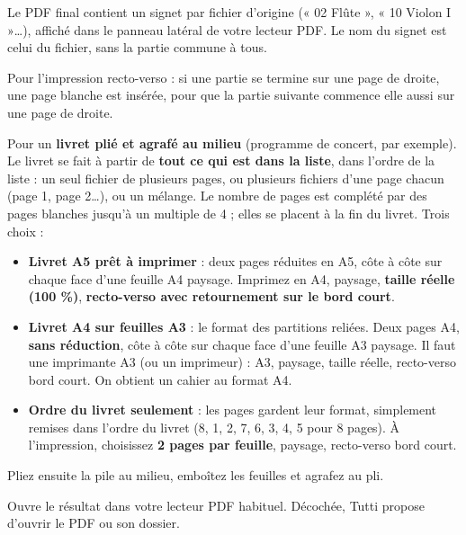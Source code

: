 \begin{description}[style=nextline,leftmargin=5mm,font=\sffamily\bfseries\color{bordeaux}]
\item[Un signet par fichier]
Le PDF final contient un signet par fichier d'origine (« 02 Flûte », « 10 Violon I »…), affiché
dans le panneau latéral de votre lecteur PDF. Le nom du signet est celui du fichier, sans la
partie commune à tous.
\item[Chaque partie commence sur une page de droite]
Pour l'impression recto-verso : si une partie se termine sur une page de droite, une page blanche
est insérée, pour que la partie suivante commence elle aussi sur une page de droite.
\item[Mise en page : livret]
Pour un \textbf{livret plié et agrafé au milieu} (programme de concert, par exemple). Le livret
se fait à partir de \textbf{tout ce qui est dans la liste}, dans l'ordre de la liste : un seul
fichier de plusieurs pages, ou plusieurs fichiers d'une page chacun (page 1, page 2…), ou un
mélange. Le nombre de pages est complété par des pages blanches jusqu'à un multiple de 4 ; elles
se placent à la fin du livret. Trois choix :
\begin{itemize}
\item \textbf{Livret A5 prêt à imprimer} : deux pages réduites en A5, côte à côte sur chaque face
      d'une feuille A4 paysage. Imprimez en A4, paysage, \textbf{taille réelle (100 \%)},
      \textbf{recto-verso avec retournement sur le bord court}.
\item \textbf{Livret A4 sur feuilles A3} : le format des partitions reliées. Deux pages A4,
      \textbf{sans réduction}, côte à côte sur chaque face d'une feuille A3 paysage. Il faut une
      imprimante A3 (ou un imprimeur) : A3, paysage, taille réelle, recto-verso bord court.
      On obtient un cahier au format A4.
\item \textbf{Ordre du livret seulement} : les pages gardent leur format, simplement remises dans
      l'ordre du livret (8, 1, 2, 7, 6, 3, 4, 5 pour 8 pages). À l'impression, choisissez
      \textbf{2 pages par feuille}, paysage, recto-verso bord court.
\end{itemize}
Pliez ensuite la pile au milieu, emboîtez les feuilles et agrafez au pli.
\item[Ouvrir le PDF une fois terminé]
Ouvre le résultat dans votre lecteur PDF habituel. Décochée, Tutti propose d'ouvrir le PDF
ou son dossier.
\end{description}

